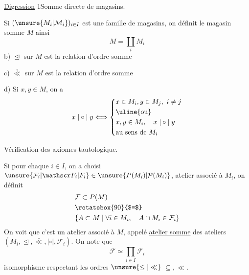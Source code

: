 
\uline{Digression} 1\quad Somme directe de magasins.

Si $(\unsure{M_i|\mathcal M_i})_{i\in I}$ est une famille de magasins, on définit le magasin somme $M$ ainsi
\[
M=\coprod_i M_i
\tag*{a)}
\]
b) $\trianglelefteq$ sur $M$ est la relation d'ordre somme

c) $\overset{\circ}{\ll}$ sur $M$ est la relation d'ordre somme

d) Si $x,y\in M$, on a
\[
x\mathrel{|\circ|}y\Longleftrightarrow
\left\{\begin{aligned}
&x\in M_i,y\in M_j,\ i\neq j\\
&\text{\uline{ou}}\\
&x,y\in M_i,\quad x\mathrel{|\circ|}y\\
&\text{au sens de }M_i
\end{aligned}\right.
\]

Vérification des axiomes tautologique.

Si pour chaque $i\in I$, on a choisi $\unsure{\mathcal F_i|\mathscr F_i|F_i}\in\unsure{P(M_i)|\mathcal P(M_i)}$, atelier associé à $M_i$, on définit
\[
\begin{aligned}
&\mathcal F\subset P(M)\\
&\rotatebox{90}{$=$}\\
&\{A\subset M\mid\forall i\in M_i,\quad A\cap M_i\in\mathcal F_i\}
\end{aligned}
\]
On voit que c'est un atelier associé à $M$, appelé \uline{atelier somme} des ateliers $(M_i,\trianglelefteq,\overset{\circ}{\ll},|\circ|,\mathcal F_i)$. On note que
\[
\mathcal F\simeq\prod_{i\in I}\mathcal F_i
\]
isomorphisme respectant les ordres $\unsure{\leq|\ll}$ $\subseteq,\ll$.
